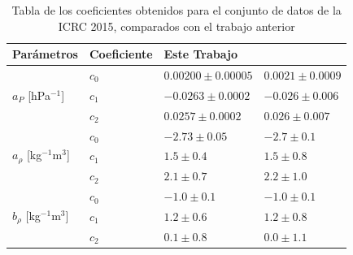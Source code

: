                 \begin{table}[H]
                    \centering
                    \begin{tabular}{|l|l|l|l|}\hline
                         Parámetros									& Coeficiente		& Este Trabajo			& \cite{aab2017impact}	\\ \hline
                     \multirow{3}{*}{$a_P$ [hPa$^{-1}$]}  			&  $c_0$			& $ 0.00200\pm 0.00005$	& $0.0021 \pm 0.0009 $	\\ \cline{2-4} %
                                                                     &  $c_1$			& $-0.0263 \pm 0.0002$	& $-0.026 \pm 0.006 $	\\ \cline{2-4} 
                                                                    &  $c_2$			& $ 0.0257 \pm 0.0002$	& $0.026  \pm 0.007 $	\\ \hline %
                    
                     \multirow{3}{*}{$a_\rho$ [kg$^{-1}$m$^3$]}  	&  $c_0$			& $-2.73   \pm 0.05$	& $ -2.7  \pm 0.1  $\\ \cline{2-4} 
                                                                     &  $c_1$			& $ 1.5    \pm 0.4 $	& $ 1.5   \pm 0.8  $\\ \cline{2-4} 
                                                                    &  $c_2$			& $ 2.1    \pm 0.7 $	& $ 2.2   \pm 1.0  $\\ \hline %
                    
                    \multirow{3}{*}{$b_\rho$ [kg$^{-1}$m$^3$]} 		&  $c_0$			& $-1.0    \pm 0.1$		& $-1.0   \pm 0.1 $	\\ \cline{2-4} 
                                                                    &  $c_1$			& $ 1.2    \pm 0.6$		& $ 1.2   \pm 0.8  $	\\ \cline{2-4} 
                                                                    &  $c_2$			& $ 0.1    \pm 0.8$		& $ 0.0   \pm 1.1  $	\\ \hline 
                    
                    \end{tabular}	
                    \caption{Tabla de los coeficientes obtenidos para el conjunto de datos de la ICRC 2015, comparados con el trabajo anterior \cite{aab2017impact}} \label{tabla:cuadratica_ICRC_2015}
                \end{table}


